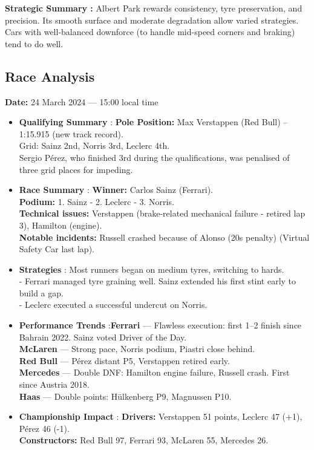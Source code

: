 \textbf{Strategic Summary :}
Albert Park rewards consistency, tyre preservation, and precision. Its smooth surface and moderate degradation allow varied strategies. Cars with well-balanced downforce (to handle mid-speed corners and braking) tend to do well.


\subsection{Race Analysis}

\textbf{Date:} 24 March 2024 — 15:00 local time 

\begin{itemize}
    \item \textbf{Qualifying Summary} : \textbf{Pole Position:} Max Verstappen (Red Bull) – 1:15.915 (new track record). \\
    Grid: Sainz 2nd, Norris 3rd, Leclerc 4th.\\
    Sergio Pérez, who finished 3rd during the qualifications, was penalised of three grid places for impeding.
    
    \item \textbf{Race Summary} : \textbf{Winner:} Carlos Sainz (Ferrari). \\
    \textbf{Podium:} 1. Sainz - 2. Leclerc - 3. Norris.\\
    \textbf{Technical issues:} Verstappen (brake-related mechanical failure - retired lap 3), Hamilton (engine).\\
    \textbf{Notable incidents:} Russell crashed because of Alonso (20s penalty) (Virtual Safety Car last lap).
    
    \item \textbf{Strategies} : Most runners began on medium tyres, switching to hards.\\
    - Ferrari managed tyre graining well. Sainz extended his first stint early to build a gap.\\
    - Leclerc executed a successful undercut on Norris.
    
    \item \textbf{Performance Trends} :\textbf{Ferrari} — Flawless execution: first 1–2 finish since Bahrain 2022. Sainz voted Driver of the Day. \\
    \textbf{McLaren} — Strong pace, Norris podium, Piastri close behind. \\
    \textbf{Red Bull} — Pérez distant P5, Verstappen retired early. \\
    \textbf{Mercedes} — Double DNF: Hamilton engine failure, Russell crash. First since Austria 2018.\\
    \textbf{Haas} — Double points: Hülkenberg P9, Magnussen P10. 
    
    \item \textbf{Championship Impact} : \textbf{Drivers:} Verstappen 51 points, Leclerc 47 (+1), Pérez 46 (-1).\\
    \textbf{Constructors:} Red Bull 97, Ferrari 93, McLaren 55, Mercedes 26.
\end{itemize}

